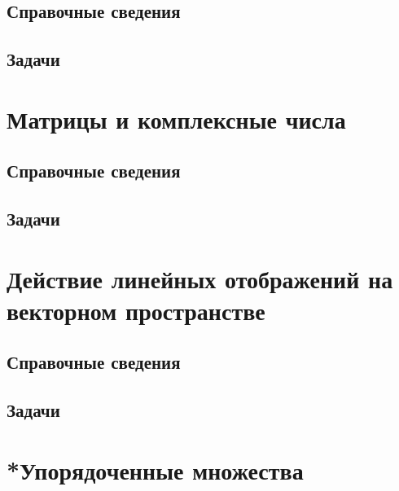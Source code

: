 \subsection*{Справочные сведения}

\subsection*{Задачи}



\section{Матрицы и комплексные числа}

\subsection*{Справочные сведения}

\subsection*{Задачи}




\section{Действие линейных отображений на векторном пространстве}

\subsection*{Справочные сведения}

\subsection*{Задачи}

\section{*Упорядоченные множества}\label{Ordering}

